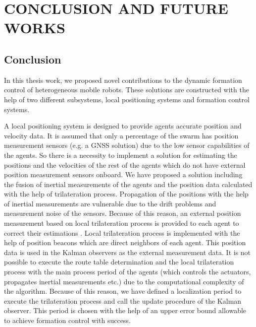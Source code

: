 

\chapter{CONCLUSION AND FUTURE WORKS}
\label{chp:conclusion}








	
\section{Conclusion}
In this thesis work, we proposed novel contributions to the dynamic formation control of heterogeneous mobile robots. These solutions are constructed with the help of two different subsystems, local positioning systems and formation control systems. 

A	local positioning system is designed to provide agents accurate position and velocity data. It is assumed that only a percentage of the swarm has position measurement sensors (e.g. a GNSS solution) due to the low sensor capabilities of the agents. So there is a necessity to implement a solution for estimating the positions and the velocities of the rest of the agents which do not have external position measurement sensors onboard.  We have proposed a solution including the fusion of inertial measurements of the agents and the position data calculated with the help of trilateration process. Propagation of the positions with the help of inertial measurements are vulnerable due to the drift problems and measurement noise of the sensors. Because of this reason, an external position measurement based on local trilateration process is provided to each agent to correct their estimations . Local trilateration process is implemented with the help of position beacons which are direct neighbors of each agent. This position data is used in the Kalman observers as the external measurement data. It is not possible to execute the route table determination and the local trilateration process with the main process period of the agents (which controls the actuators, propagates inertial measurements etc.) due to the computational complexity of the algorithm. Because of this reason, we have defined a localization period to execute the trilateration process and call the update procedure of the Kalman observer. This period is chosen with the help of an upper error bound allowable to achieve formation control with success.
       
